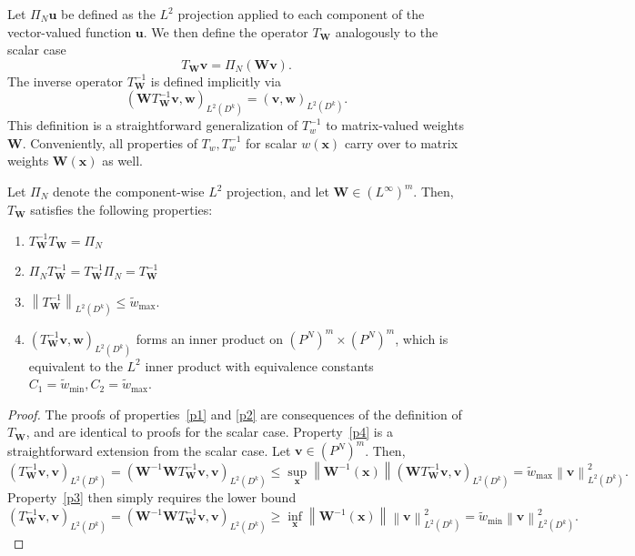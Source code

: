 \documentclass{siamart0216}
\newcommand{\nor}[1]{\left\| #1 \right\|}
\newcommand{\LRp}[1]{\left( #1 \right)}
\newcommand{\Lk}{L^2\LRp{D^k}}
\begin{document}
Let $\Pi_N\bm{u}$ be defined as the $L^2$ projection applied to each component of the vector-valued function $\bm{u}$.  We then define the operator $T_{\bm{W}}$ analogously to the scalar case
\[
T_{\bm{W}}\bm{v} = \Pi_N\LRp{\bm{W}\bm{v}}.  
\]
The inverse operator $T^{-1}_{\bm{W}}$ is defined implicitly via
\[
\LRp{\bm{W}T^{-1}_{\bm{W}}\bm{v},\bm{w}}_{\Lk} = \LRp{\bm{v},\bm{w}}_{\Lk}.
\]
This definition is a straightforward generalization of $T^{-1}_{w}$ to matrix-valued weights $\bm{W}$.  Conveniently, all properties of $T_{w},T^{-1}_{w}$ for scalar $w(\bm{x})$ \cite{chan2016weight1} carry over to matrix weights $\bm{W}(\bm{x})$ as well.
\begin{lemma}
Let $\Pi_N$ denote the component-wise $L^2$ projection, and let $\bm{W} \in \LRp{L^{\infty}}^m$.  Then, $T_{\bm{W}}$ satisfies the following properties:
\begin{enumerate}
\vspace{.5em}
\item $T_{\bm{W}}^{-1}T_{\bm{W}} = \Pi_N$ \label{p1}
\vspace{.5em}
\item $\Pi_N T_{\bm{W}}^{-1} = T_{\bm{W}}^{-1}\Pi_N  =  T_{\bm{W}}^{-1}$ \label{p2}
\vspace{.5em}
\item $\nor{T^{-1}_{\bm{W}}}_{\Lk} \leq \tilde{w}_{\max}$. \label{p4}
\vspace{.5em}
\item $\LRp{T^{-1}_{\bm{W}} \bm{v},\bm{w}}_{\Lk}$ forms an inner product on $\LRp{P^N}^m \times \LRp{P^N}^m$, which is equivalent to the $L^2$ inner product with equivalence constants $C_1 = \tilde{w}_{\min}, C_2 = \tilde{w}_{\max}$. \label{p3}
\vspace{.5em}
\end{enumerate}
\label{lemma:props}
\end{lemma}
\begin{proof}
The proofs of properties~\ref{p1} and \ref{p2} are consequences of the definition of $T_{\bm{W}}$, and are identical to proofs for the scalar case.  Property~\ref{p4} is a straightforward extension from the scalar case.  Let $\bm{v}\in \LRp{P^N}^m$.  Then, 
\[
\LRp{T^{-1}_{\bm{W}} \bm{v},\bm{v}}_{\Lk} = \LRp{\bm{W}^{-1}\bm{W}T^{-1}_{\bm{W}} \bm{v},\bm{v}}_{\Lk} \leq \sup_{\bm{x}}\nor{\bm{W}^{-1}(\bm{x})}\LRp{\bm{W}T^{-1}_{\bm{W}} \bm{v},\bm{v}}_{\Lk} = \tilde{w}_{\max} \nor{\bm{v}}_{\Lk}^2.
\]
Property~\ref{p3} then simply requires the lower bound
\[
\LRp{T^{-1}_{\bm{W}} \bm{v},\bm{v}}_{\Lk} = \LRp{\bm{W}^{-1}\bm{W}T^{-1}_{\bm{W}} \bm{v},\bm{v}}_{\Lk} \geq \inf_{\bm{x}}\nor{\bm{W}^{-1}(\bm{x})}\nor{\bm{v}}_{\Lk}^2 = \tilde{w}_{\min}\nor{\bm{v}}_{\Lk}^2 .  
\]
\end{proof}
\end{document}
